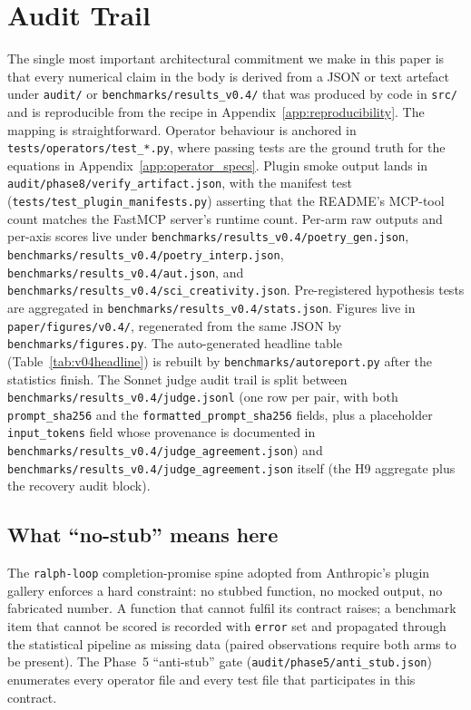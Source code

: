 \section{Audit Trail}\label{app:audit}

{\sloppy
The single most important architectural commitment we make in this paper is that every numerical claim in the body is derived from a JSON or text artefact under \nolinkurl{audit/} or \nolinkurl{benchmarks/results_v0.4/} that was produced by code in \nolinkurl{src/} and is reproducible from the recipe in Appendix~\ref{app:reproducibility}. The mapping is straightforward. Operator behaviour is anchored in \nolinkurl{tests/operators/test_*.py}, where passing tests are the ground truth for the equations in Appendix~\ref{app:operator_specs}. Plugin smoke output lands in \nolinkurl{audit/phase8/verify_artifact.json}, with the manifest test (\nolinkurl{tests/test_plugin_manifests.py}) asserting that the README's MCP-tool count matches the FastMCP server's runtime count. Per-arm raw outputs and per-axis scores live under \nolinkurl{benchmarks/results_v0.4/poetry_gen.json}, \nolinkurl{benchmarks/results_v0.4/poetry_interp.json}, \nolinkurl{benchmarks/results_v0.4/aut.json}, and \nolinkurl{benchmarks/results_v0.4/sci_creativity.json}. Pre-registered hypothesis tests are aggregated in \nolinkurl{benchmarks/results_v0.4/stats.json}. Figures live in \nolinkurl{paper/figures/v0.4/}, regenerated from the same JSON by \nolinkurl{benchmarks/figures.py}. The auto-generated headline table (Table~\ref{tab:v04headline}) is rebuilt by \nolinkurl{benchmarks/autoreport.py} after the statistics finish. The Sonnet judge audit trail is split between \nolinkurl{benchmarks/results_v0.4/judge.jsonl} (one row per pair, with both \texttt{prompt\_sha256} and the \texttt{formatted\_prompt\_sha256} fields, plus a placeholder \texttt{input\_tokens} field whose provenance is documented in \nolinkurl{benchmarks/results_v0.4/judge_agreement.json}) and \nolinkurl{benchmarks/results_v0.4/judge_agreement.json} itself (the H9 aggregate plus the recovery audit block).
\par}

\subsection{What ``no-stub'' means here}

The \texttt{ralph-loop} completion-promise spine adopted from Anthropic's plugin gallery enforces a hard constraint: no stubbed function, no mocked output, no fabricated number. A function that cannot fulfil its contract raises; a benchmark item that cannot be scored is recorded with \texttt{error} set and propagated through the statistical pipeline as missing data (paired observations require both arms to be present). The Phase~5 ``anti-stub'' gate (\texttt{audit/phase5/anti\_stub.json}) enumerates every operator file and every test file that participates in this contract.
